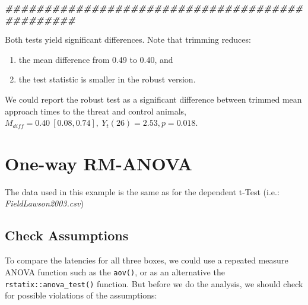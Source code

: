 \documentclass[
]{article}
\newenvironment{Shaded}{\begin{snugshade}}{\end{snugshade}}
\newcommand{\CommentTok}[1]{\textcolor[rgb]{0.56,0.35,0.01}{\textit{#1}}}
\newcommand{\DecValTok}[1]{\textcolor[rgb]{0.00,0.00,0.81}{#1}}
\newcommand{\DocumentationTok}[1]{\textcolor[rgb]{0.56,0.35,0.01}{\textbf{\textit{#1}}}}
\newcommand{\FunctionTok}[1]{\textcolor[rgb]{0.13,0.29,0.53}{\textbf{#1}}}
\newcommand{\NormalTok}[1]{#1}
\newcommand{\OtherTok}[1]{\textcolor[rgb]{0.56,0.35,0.01}{#1}}
\newcommand{\SpecialCharTok}[1]{\textcolor[rgb]{0.81,0.36,0.00}{\textbf{#1}}}
\providecommand{\tightlist}{%
  \setlength{\itemsep}{0pt}\setlength{\parskip}{0pt}}
\begin{document}
\begin{Shaded}
\begin{Highlighting}[]
  \DocumentationTok{\#\#\#\#\#\#\#\#\#\#\#\#\#\#\#\#\#\#\#\#\#\#\#\#\#\#\#\#\#\#\#\#\#\#\#\#\#\#\#\#\#\#\#\#\#\#\#}
\end{Highlighting}
\end{Shaded}

Both tests yield significant differences. Note that trimming reduces:

\begin{enumerate}
\def\labelenumi{\arabic{enumi}.}
\tightlist
\item
  the mean difference from 0.49 to 0.40, and
\item
  the test statistic is smaller in the robust version.
\end{enumerate}

We could report the robust test as a significant difference between trimmed mean approach times to the threat and control animals, \(M_{diff} = 0.40 \ [0.08, 0.74], \ Y_t (26) = 2.53, p = 0.018\).

\section*{One-way RM-ANOVA}\label{one-way-rm-anova}

The data used in this example is the same as for the dependent t-Test (i.e.: \emph{FieldLawson2003.csv})

\subsection*{Check Assumptions}\label{check-assumptions-1}

To compare the latencies for all three boxes, we could use a repeated measure ANOVA function such as the \texttt{aov()}, or as an alternative the \texttt{rstatix::anova\_test()} function. But before we do the analysis, we should check for possible violations of the assumptions:

\begin{Shaded}
\end{Shaded}
\end{document}
